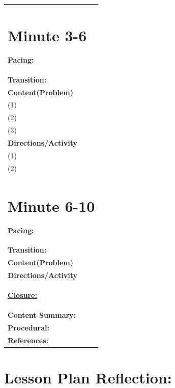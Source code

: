 \documentclass{article}
\begin{document}
\begin{longtable}{ | m{50em} | }
\section*{Minute 3-6}
\footnotesize \textbf{Pacing:} \\
\footnotesize \textbf{Transition:} \\
\footnotesize \textbf{Content(Problem)}\\
\footnotesize (1)\\
\footnotesize (2) \\
\footnotesize (3)\\
\footnotesize \textbf{Directions/Activity}\\
\footnotesize (1) \\
\footnotesize (2) \\

\section*{Minute 6-10}

\footnotesize \textbf{Pacing:} \\
\footnotesize \textbf{Transition:} \\
\footnotesize \textbf{Content(Problem)}\\
\footnotesize \textbf{Directions/Activity}\\

  \hline 
  \begin{center}
      \underline{\textbf{Closure:}}
  \end{center}\\
  \textbf{Content Summary:}\\
  \textbf{Procedural:}\\
  \hline
  \textbf{References:}\\
  \hline 
\end{longtable} %

\section*{Lesson Plan Reflection:}
\end{document}
